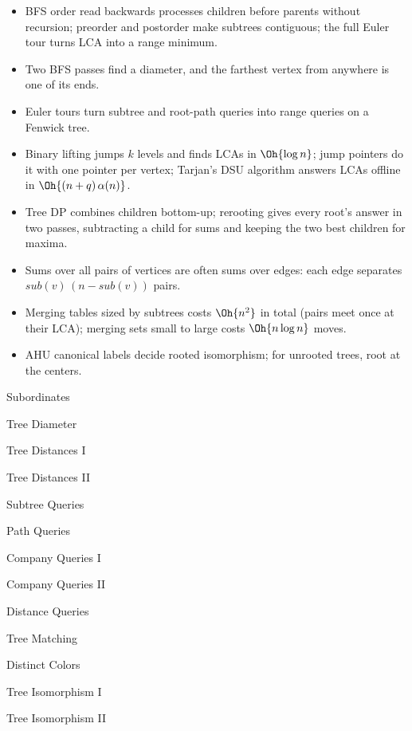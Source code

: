 \begin{summary}
\begin{itemize}
  \item BFS order read backwards processes children before parents without recursion; preorder and postorder make subtrees
        contiguous; the full Euler tour turns LCA into a range minimum.
  \item Two BFS passes find a diameter, and the farthest vertex from anywhere is one of its ends.
  \item Euler tours turn subtree and root-path queries into range queries on a Fenwick tree.
  \item Binary lifting jumps $k$ levels and finds LCAs in $\Oh{\log n}$; jump pointers do it with one pointer per vertex; Tarjan's
        DSU algorithm answers LCAs offline in $\Oh{(n + q)\,\alpha(n)}$.
  \item Tree DP combines children bottom-up; rerooting gives every root's answer in two passes, subtracting a child for sums and
        keeping the two best children for maxima.
  \item Sums over all pairs of vertices are often sums over edges: each edge separates $\mathit{sub}(v)\,(n - \mathit{sub}(v))$
        pairs.
  \item Merging tables sized by subtrees costs $\Oh{n^2}$ in total (pairs meet once at their LCA); merging sets small to large costs
        $\Oh{n \log n}$ moves.
  \item AHU canonical labels decide rooted isomorphism; for unrooted trees, root at the centers.
\end{itemize}
\end{summary}

\begin{practice}
\begin{pplist}
  \item Subordinates
  \item Tree Diameter
  \item Tree Distances I
  \item Tree Distances II
  \item Subtree Queries
  \item Path Queries
\end{pplist}
\begin{pplist}
  \item Company Queries I
  \item Company Queries II
  \item Distance Queries
  \item Tree Matching
  \item Distinct Colors
  \item Tree Isomorphism I
  \item Tree Isomorphism II
\end{pplist}
\end{practice}
